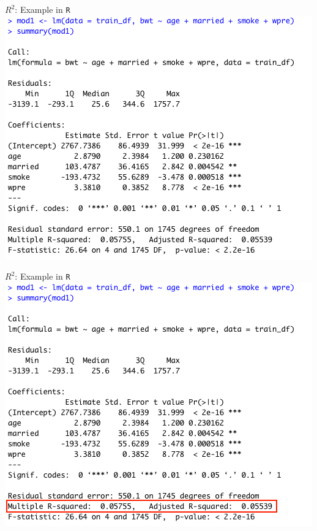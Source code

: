 \documentclass[10pt,t]{beamer}
\begin{document}
\begin{frame}{$R^2$: Example in \texttt{R}}
\centering \includegraphics[scale=0.4]{figures/r2_example1.png}
\end{frame}

\begin{frame}{$R^2$: Example in \texttt{R}}
\centering \includegraphics[scale=0.4]{figures/r2_example1_2.png}
\end{frame}
\end{document}
